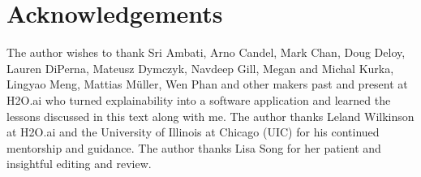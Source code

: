 \documentclass[11pt]{asaproc}
\begin{document}
\section{Acknowledgements} 

The author wishes to thank Sri Ambati, Arno Candel, Mark Chan,  Doug Deloy, Lauren DiPerna, Mateusz Dymczyk, Navdeep Gill, Megan and Michal Kurka, Lingyao Meng, Mattias M\"uller, Wen Phan and other makers past and present at H2O.ai who turned explainability into a software application and learned the lessons discussed in this text along with me. The author thanks Leland Wilkinson at H2O.ai and the University of Illinois at Chicago (UIC) for his continued mentorship and guidance. The author thanks Lisa Song for her patient and insightful editing and review. 




\end{document}
